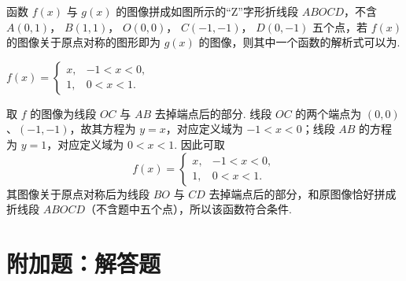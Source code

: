 \begin{problem}
函数 \( f(x) \) 与 \( g(x) \) 的图像拼成如图所示的“Z”字形折线段 \(ABOCD\)，不含 \( A(0,1)\)， \( B(1,1)\)， \( O(0,0)\)， \( C(-1,-1)\)， \( D(0,-1) \) 五个点，若 \( f(x) \) 的图像关于原点对称的图形即为 \( g(x) \) 的图像，则其中一个函数的解析式可以为\fillinblank{}.

\begin{answer}
\(f(x)=\begin{cases}
x,&-1<x<0,\\
1,&0<x<1.
\end{cases}\)
\end{answer}

\begin{solution}
取 \(f\) 的图像为线段 \(OC\) 与 \(AB\) 去掉端点后的部分. 线段 \(OC\) 的两个端点为 \((0,0)\)、\((-1,-1)\)，故其方程为 \(y=x\)，对应定义域为 \(-1<x<0\)；线段 \(AB\) 的方程为 \(y=1\)，对应定义域为 \(0<x<1\). 因此可取
\[
f(x)=\begin{cases}
x,&-1<x<0,\\
1,&0<x<1.
\end{cases}
\]
其图像关于原点对称后为线段 \(BO\) 与 \(CD\) 去掉端点后的部分，和原图像恰好拼成折线段 \(ABOCD\)（不含题中五个点），所以该函数符合条件.
\end{solution}
\end{problem}

\section{附加题：解答题}

